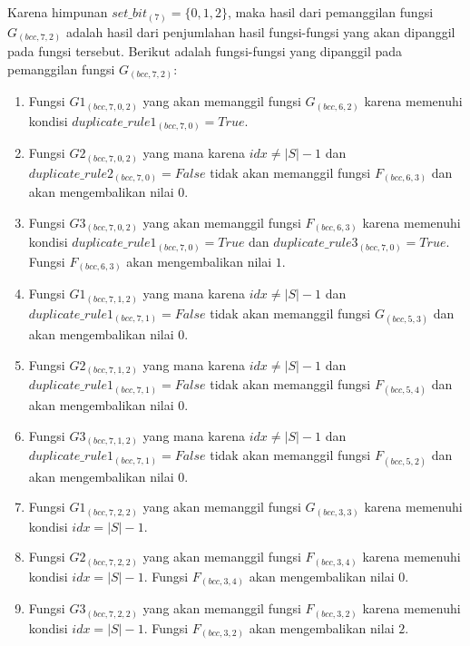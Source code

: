 Karena himpunan $ set\_bit_{(7)} = \{0, 1, 2\} $, maka hasil dari pemanggilan fungsi $ G_{(bcc, 7, 2)} $ adalah hasil dari penjumlahan hasil fungsi-fungsi yang akan dipanggil pada fungsi tersebut. Berikut adalah fungsi-fungsi yang dipanggil pada pemanggilan fungsi $ G_{(bcc, 7, 2)} $:
\begin{enumerate}
	\item Fungsi $ G1_{(bcc, 7, 0, 2)} $ yang akan memanggil fungsi $ G_{(bcc, 6, 2)} $ karena memenuhi kondisi $ duplicate\_rule1_{(bcc, 7, 0)} = True$.
	\item Fungsi $ G2_{(bcc, 7, 0, 2)} $ yang mana karena $ idx \neq |S|-1 $ dan $ duplicate\_rule2_{(bcc, 7, 0)} = False$ tidak akan memanggil fungsi $ F_{(bcc, 6, 3)} $ dan akan mengembalikan nilai $ 0 $.
	\item Fungsi $ G3_{(bcc, 7, 0, 2)} $ yang akan memanggil fungsi $ F_{(bcc, 6, 3)} $ karena memenuhi kondisi $ duplicate\_rule1_{(bcc, 7, 0)} = True$ dan $ duplicate\_rule3_{(bcc, 7, 0)} = True$. Fungsi $ F_{(bcc, 6, 3)} $ akan mengembalikan nilai $ 1 $.
	
	\item Fungsi $ G1_{(bcc, 7, 1, 2)} $ yang mana karena $ idx \neq |S|-1 $ dan $ duplicate\_rule1_{(bcc, 7, 1)} = False$ tidak akan memanggil fungsi $ G_{(bcc, 5, 3)} $ dan akan mengembalikan nilai $ 0 $.
	\item Fungsi $ G2_{(bcc, 7, 1, 2)} $ yang mana karena $ idx \neq |S|-1 $ dan $ duplicate\_rule1_{(bcc, 7, 1)} = False$ tidak akan memanggil fungsi $ F_{(bcc, 5, 4)} $ dan akan mengembalikan nilai $ 0 $.
	\item Fungsi $ G3_{(bcc, 7, 1, 2)} $ yang mana karena $ idx \neq |S|-1 $ dan $ duplicate\_rule1_{(bcc, 7, 1)} = False$ tidak akan memanggil fungsi $ F_{(bcc, 5, 2)} $ dan akan mengembalikan nilai $ 0 $.
	
	\item Fungsi $ G1_{(bcc, 7, 2, 2)} $ yang akan memanggil fungsi $ G_{(bcc, 3, 3)} $ karena memenuhi kondisi $ idx = |S| - 1 $.
	\item Fungsi $ G2_{(bcc, 7, 2, 2)} $ yang akan memanggil fungsi $ F_{(bcc, 3, 4)} $ karena memenuhi kondisi $ idx = |S| - 1 $. Fungsi  $ F_{(bcc, 3, 4)} $ akan mengembalikan nilai $ 0 $.
	\item Fungsi $ G3_{(bcc, 7, 2, 2)} $ yang akan memanggil fungsi $ F_{(bcc, 3, 2)} $ karena memenuhi kondisi $ idx = |S| - 1 $. Fungsi $ F_{(bcc, 3, 2)} $ akan mengembalikan nilai $ 2 $.
\end{enumerate}

